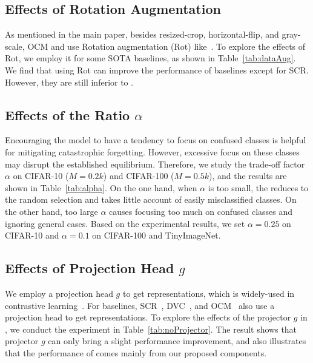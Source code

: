 \subsection{Effects of Rotation Augmentation} 
As mentioned in the main paper, besides resized-crop, horizontal-flip, and gray-scale, OCM and \frameworkName use Rotation augmentation (Rot) like~\cite{protoAug}. To explore the effects of Rot, we employ it for some SOTA baselines, as shown in Table~\ref{tab:dataAug}. We find that using Rot can improve the performance of baselines except for SCR. However, they are still inferior to \frameworkName.







\subsection{Effects of the \dataaugname Ratio $\alpha$}
Encouraging the model to have a tendency to focus on confused classes is helpful for mitigating catastrophic forgetting. However, excessive focus on these classes may disrupt the established equilibrium. 
Therefore, we study the trade-off factor $\alpha$ on CIFAR-10 (${M=0.2k}$) and CIFAR-100 (${M=0.5k}$), and the results are shown in Table~\ref{tab:alpha}.
On the one hand, when $\alpha$ is too small, the \dataaugname reduces to the random selection and takes little account of easily misclassified classes.
On the other hand, too large $\alpha$ causes focusing too much on confused classes and ignoring general cases. Based on the experimental results, we set $\alpha=0.25$ on CIFAR-10 and $\alpha=0.1$ on CIFAR-100 and TinyImageNet.


\subsection{Effects of Projection Head $g$}
We employ a projection head $g$ to get representations, which is widely-used in contrastive learning~\cite{SimCLR}. For baselines, SCR~\cite{SCR}, DVC~\cite{DVC}, and OCM~\cite{OCM} also use a projection head to get representations. To explore the effects of the projector $g$ in \frameworkName, we conduct the experiment in Table~\ref{tab:noProjector}. 
The result shows that projector $g$ can only bring a slight performance improvement, and also illustrates that the performance of \frameworkName comes mainly from our proposed components.





